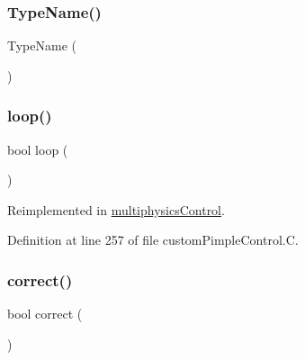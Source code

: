 \subsubsection{\texorpdfstring{Type\+Name()}{TypeName()}}
{\footnotesize\ttfamily Type\+Name (\begin{DoxyParamCaption}\item[{\char`\"{}custom\+Pimple\+Control\char`\"{}}]{ }\end{DoxyParamCaption})}

\mbox{\label{classFoam_1_1customPimpleControl_adf77b77054c2d4c23b70556fe767f23e}} 
\subsubsection{\texorpdfstring{loop()}{loop()}}
{\footnotesize\ttfamily bool loop (\begin{DoxyParamCaption}{ }\end{DoxyParamCaption})\hspace{0.3cm}{\ttfamily [virtual]}}



Reimplemented in \hyperlink{classFoam_1_1multiphysicsControl_adf77b77054c2d4c23b70556fe767f23e}{multiphysics\+Control}.



Definition at line 257 of file custom\+Pimple\+Control.\+C.

\mbox{\label{classFoam_1_1customPimpleControl_a964daab2755d32e82bff1b36c0a26e90}} 
\subsubsection{\texorpdfstring{correct()}{correct()}\hspace{0.1cm}{\footnotesize\ttfamily [1/2]}}
{\footnotesize\ttfamily bool correct (\begin{DoxyParamCaption}{ }\end{DoxyParamCaption})\hspace{0.3cm}{\ttfamily [inline]}}



